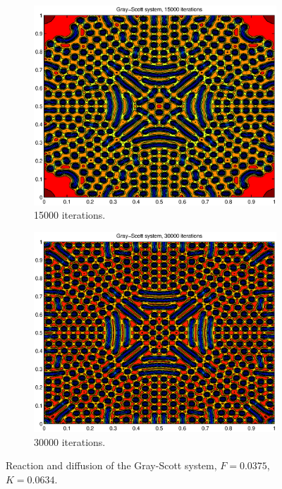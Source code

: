\documentclass[a4paper,11pt]{article}
\begin{document}
\begin{figure}
    \hfill
    \begin{subfigure}[b]{0.48\textwidth}
        \centering
        \includegraphics[width=\textwidth]{it_15000}
        \caption{15000 iterations.}
        \label{fig:it_15000}
    \end{subfigure}
    \hfill
    \begin{subfigure}[b]{0.48\textwidth}
        \centering
        \includegraphics[width=\textwidth]{it_30000}
        \caption{30000 iterations.}
        \label{fig:it_30000}
    \end{subfigure}
    \caption{Reaction and diffusion of the Gray-Scott system, $F=0.0375$, $K=0.0634$.}
    \label{fig:gray-scott}
\end{figure}
\end{document}
